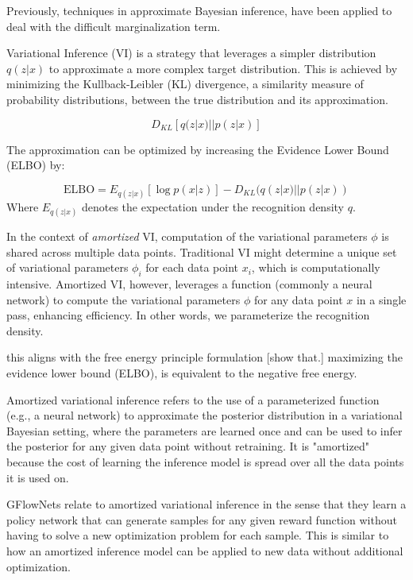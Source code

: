 Previously, techniques in approximate Bayesian inference, have been applied to deal with the difficult marginalization term.

Variational Inference (VI) is a strategy that leverages a simpler distribution \( q(z | x) \)  to approximate a more complex target distribution. This is achieved by minimizing the Kullback-Leibler (KL) divergence, a similarity measure of probability distributions, between the true distribution and its approximation.

\[
    D_{KL}[q(z|x) || p(z|x)]
\]

The approximation can be optimized by increasing the Evidence Lower Bound (ELBO) by:

\begin{equation}
\text{ELBO} = E_{q(z|x)}[\log p(x|z)] - D_{KL}(q(z|x) || p(z|x))
\end{equation}
Where \( E_{q(z|x)} \) denotes the expectation under the recognition density \( q \).

In the context of \emph{amortized} VI, computation of the variational parameters \( \phi \) is shared across multiple data points. Traditional VI might determine a unique set of variational parameters \( \phi_i \) for each data point \( x_i \), which is computationally intensive. Amortized VI, however, leverages a function (commonly a neural network) to compute the variational parameters \( \phi \) for any data point \( x \) in a single pass, enhancing efficiency. In other words, we parameterize the recognition density. 

this aligns with the free energy principle formulation [show that.]
maximizing the evidence lower bound (ELBO), is equivalent to the negative free energy. 

Amortized variational inference refers to the use of a parameterized function (e.g., a neural network) to approximate the posterior distribution in a variational Bayesian setting, where the parameters are learned once and can be used to infer the posterior for any given data point without retraining. It is "amortized" because the cost of learning the inference model is spread over all the data points it is used on.

GFlowNets relate to amortized variational inference in the sense that they learn a policy network that can generate samples for any given reward function without having to solve a new optimization problem for each sample. This is similar to how an amortized inference model can be applied to new data without additional optimization.

